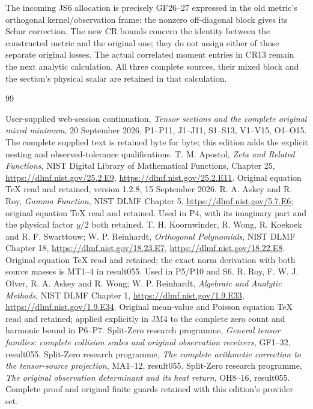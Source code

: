 \documentclass[11pt]{article}
\begin{document}
The incoming JS6 allocation is precisely GF26--27 expressed in the
old metric's orthogonal kernel/observation frame: the nonzero
off-diagonal block gives its Schur correction. The new CR bounds
concern the identity between the constructed metric and the original
one; they do not assign either of those separate original losses.
The actual correlated moment entries in CR13 remain the next analytic
calculation. All three complete sources, their mixed block and the
section's physical scalar are retained in that calculation.



\clearpage
\begin{thebibliography}{99}
\raggedright

 User-supplied web-session continuation,
\emph{Tensor sections and the complete original mixed minimum},
20 September 2026, P1--P11, J1--J11, S1--S13, V1--V15, O1--O15.
The complete supplied text is retained byte for byte; this edition
adds the explicit nesting and observed-tolerance qualifications.
 T. M. Apostol, \emph{Zeta and Related Functions},
NIST Digital Library of Mathematical Functions, Chapter 25,
\url{https://dlmf.nist.gov/25.2.E9},
\url{https://dlmf.nist.gov/25.2.E11}. Original equation TeX read
and retained, version 1.2.8, 15 September 2026.
 R. A. Askey and R. Roy, \emph{Gamma Function},
NIST DLMF Chapter 5, \url{https://dlmf.nist.gov/5.7.E6};
original equation TeX read and retained. Used in P4, with its
imaginary part and the physical factor $y/2$ both retained.
 T. H. Koornwinder, R. Wong, R. Koekoek and
R. F. Swarttouw; W. P. Reinhardt, \emph{Orthogonal Polynomials},
NIST DLMF Chapter 18,
\url{https://dlmf.nist.gov/18.23.E7},
\url{https://dlmf.nist.gov/18.22.E8}. Original equation TeX read
and retained; the exact norm derivation with both source masses is
MT1--4 in result055. Used in P5/P10 and S6.
 R. Roy, F. W. J. Olver, R. A. Askey and R. Wong;
W. P. Reinhardt, \emph{Algebraic and Analytic Methods}, NIST DLMF
Chapter 1, \url{https://dlmf.nist.gov/1.9.E33},
\url{https://dlmf.nist.gov/1.9.E34}. Original mean-value and
Poisson equation TeX read and retained; applied explicitly in JM4
to the complete zero count and harmonic bound in P6--P7.
 Split-Zero research programme,
\emph{General tensor families: complete collision scales and
original observation receivers}, GF1--32, result055.
 Split-Zero research programme,
\emph{The complete arithmetic correction to the tensor-source
projection}, MA1--12, result055.
 Split-Zero research programme,
\emph{The original observation determinant and its heat return},
OH8--16, result055. Complete proof and original finite guards
retained with this edition's provider set.



\end{thebibliography}
\end{document}
